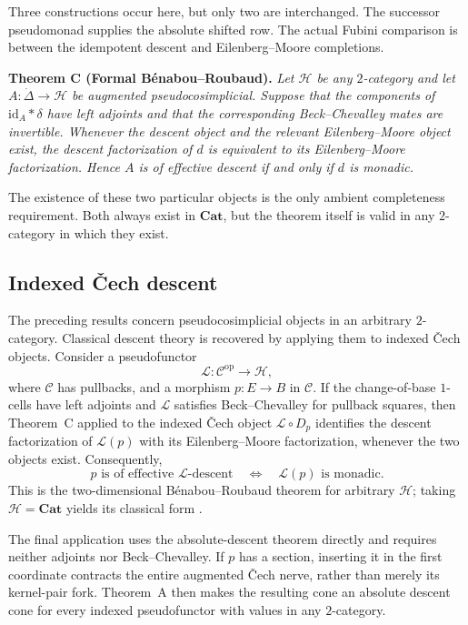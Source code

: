 \documentclass[11pt,a4paper]{article}
\numberwithin{equation}{section}
\theoremstyle{definition}
\theoremstyle{remark}
\newcommand{\id}{\mathrm{id}}
\newcommand{\Hcat}{\mathcal H}
\newcommand{\C}{\mathcal C}
\newcommand{\Lx}{\mathcal L}
\newcommand{\Cat}{\mathbf{Cat}}
\begin{document}
Three constructions occur here, but only two are interchanged. The
successor pseudomonad supplies the absolute shifted row. The actual
Fubini comparison is between the idempotent descent and
Eilenberg--Moore completions.

\medskip
\noindent\textbf{Theorem C (Formal B\'enabou--Roubaud).}
\emph{Let \(\Hcat\) be any \(2\)-category and let
	\(A\colon\dot\Delta\to\Hcat\) be augmented pseudocosimplicial. Suppose
	that the components of \(\id_A\ast\delta\) have left adjoints and that
	the corresponding Beck--Chevalley mates are invertible. Whenever the
	descent object and the relevant Eilenberg--Moore object exist, the
	descent factorization of \(d\) is equivalent to its
	Eilenberg--Moore factorization. Hence \(A\) is of effective descent if
	and only if \(d\) is monadic.}
\medskip

The existence of these two particular objects is the only ambient
completeness requirement. Both always exist in \(\Cat\), but the
theorem itself is valid in any \(2\)-category in which they exist.

\subsection*{Indexed \v{C}ech descent}

The preceding results concern pseudocosimplicial objects in an
arbitrary \(2\)-category. Classical descent theory is recovered by
applying them to indexed \v{C}ech objects. Consider a pseudofunctor
\[
\Lx\colon\C^{\mathrm{op}}\longrightarrow\Hcat,
\]
where \(\C\) has pullbacks, and a morphism \(p\colon E\to B\) in \(\C\). If the change-of-base
\(1\)-cells have left adjoints and \(\Lx\) satisfies
Beck--Chevalley for pullback squares, then Theorem~C applied to the
indexed \v{C}ech object \(\Lx\circ D_p\) identifies the descent
factorization of \(\Lx(p)\) with its Eilenberg--Moore factorization,
whenever the two objects exist. Consequently,
\[
p\text{ is of effective }\Lx\text{-descent}
\quad\Longleftrightarrow\quad
\Lx(p)\text{ is monadic}.
\]
This is the two-dimensional B\'enabou--Roubaud theorem for arbitrary
\(\Hcat\); taking \(\Hcat=\Cat\) yields its classical form
\cite{BenabouRoubaud1970,JanelidzeTholen1994}.

The final application uses the absolute-descent theorem directly and
requires neither adjoints nor Beck--Chevalley. If \(p\) has a section, inserting it in the first coordinate contracts the entire
augmented \v{C}ech nerve, rather than merely its kernel-pair fork.
Theorem~A then makes the resulting cone an absolute descent cone for
every indexed pseudofunctor with values in any \(2\)-category.
\end{document}
